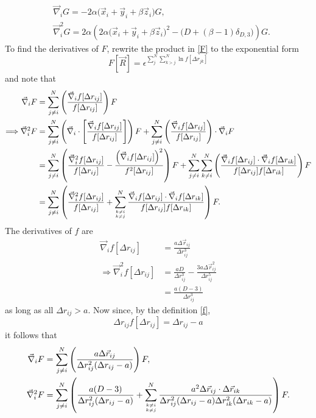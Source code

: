\documentclass[a4paper,8pt]{article}
\begin{document}
\begin{align}
&\vec{\nabla}_i G = -2\alpha\Big(\vec{x}_i+\vec{y}_i+\beta\vec{z}_i\Big)G, \label{grad_G}\\
&\vec{\nabla}_i^2G = 2\alpha\left(2\alpha\Big(\vec{x}_i+\vec{y}_i+\beta\vec{z}_i\Big)^2-\Big(D+(\beta-1)\delta_{D,3}\Big)\right)G. \label{Lap_G}
\end{align}
To find the derivatives of $F$, rewrite the product in \eqref{F} to the exponential form 
\begin{equation}
F[\vec{R}] = \epsilon^{\sum\limits_{j}^N\sum\limits_{k > j}^N \ln f[\Delta{r}_{jk}]}
\end{equation}
and note that
\begin{align}
\vec{\nabla}_i F &= \sum\limits_{j \neq i}^N \left(\frac{\vec{\nabla}_i f[\Delta{r}_{ij}]}{f[\Delta{r}_{ij}]}\right) F \nonumber\\
\Longrightarrow \vec{\nabla}_i^2 F &= \sum\limits_{j \neq i}^N \left(\vec{\nabla}_i\cdot\left[\frac{\vec{\nabla}_i f[\Delta{r}_{ij}]}{f[\Delta{r}_{ij}]}\right]\right) F + \sum\limits_{j \neq i}^N \left(\frac{\vec{\nabla}_i f[\Delta{r}_{ij}]}{f[\Delta{r}_{ij}]}\right)\cdot \vec{\nabla}_i F \nonumber\\
&= \sum\limits_{j \neq i}^N \left(\frac{\vec{\nabla}_i^2 f[\Delta{r}_{ij}]}{f[\Delta{r}_{ij}]} - \frac{\left(\vec{\nabla}_i f[\Delta{r}_{ij}]\right)^2}{f^2[\Delta{r}_{ij}]}\right) F + \sum\limits_{j \neq i}^N \sum\limits_{k \neq i}^N \left(\frac{\vec{\nabla}_i f[\Delta{r}_{ij}] \cdot\vec{\nabla}_i f[\Delta{r}_{ik}]}{f[\Delta{r}_{ij}]f[\Delta{r}_{ik}]}\right) F \nonumber\\
&= \sum\limits_{j \neq i}^N \left(\frac{\vec{\nabla}_i^2 f[\Delta{r}_{ij}]}{f[\Delta{r}_{ij}]} + \sum\limits_{{k \neq i}\atop{k \neq j}}^N \frac{\vec{\nabla}_i f[\Delta{r}_{ij}] \cdot\vec{\nabla}_i f[\Delta{r}_{ik}]}{f[\Delta{r}_{ij}]f[\Delta{r}_{ik}]}\right) F. \nonumber
\end{align}
The derivatives of $f$ are
\begin{align}
\vec{\nabla}_i f[\Delta{r}_{ij}] &= \frac{a\Delta\vec{r}_{ij}}{\Delta{r}_{ij}^3} \\
\Longrightarrow \vec{\nabla}_i^2 f[\Delta{r}_{ij}] &= \frac{aD}{\Delta{r}_{ij}^3}-\frac{3a\Delta\vec{r}_{ij}^2}{\Delta{r}_{ij}^5} \nonumber\\
&= \frac{a(D-3)}{\Delta{r}_{ij}^3}
\end{align}
as long as all $\Delta{r}_{ij} > a$. Now since, by the definition \eqref{f}, 
\begin{equation}
\Delta{r}_{ij} f[\Delta{r}_{ij}] = \Delta{r}_{ij}-a \nonumber
\end{equation}
it follows that
\begin{align}
\vec{\nabla}_i F &= \sum\limits_{j \neq i}^N \left(\frac{a\Delta\vec{r}_{ij}}{\Delta{r}_{ij}^2(\Delta{r}_{ij}-a)}\right) F, \label{grad_F}\\
\vec{\nabla}_i^2 F &= \sum\limits_{j \neq i}^N \left(\frac{a(D-3)}{\Delta{r}_{ij}^2(\Delta{r}_{ij}-a)} + \sum\limits_{{k \neq i}\atop{k \neq j}}^N \frac{a^2 \Delta\vec{r}_{ij} \cdot \Delta\vec{r}_{ik}}{\Delta{r}_{ij}^2(\Delta{r}_{ij}-a) \Delta{r}_{ik}^2(\Delta{r}_{ik}-a)}\right) F. \label{Lap_F}
\end{align}
\end{document}
